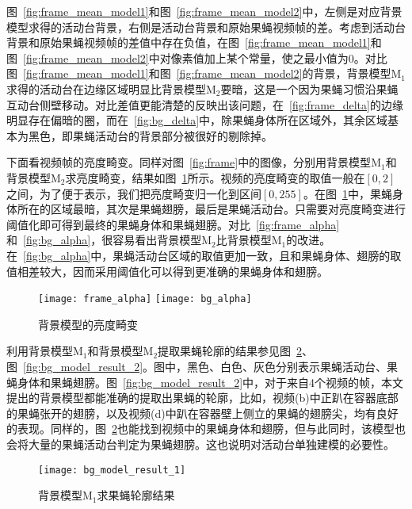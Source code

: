 图~\ref{fig:frame_mean_model1}和图~\ref{fig:frame_mean_model2}中，左侧是对应背景模型求得的活动台背景，右侧是活动台背景和原始果蝇视频帧的差。考虑到活动台背景和原始果蝇视频帧的差值中存在负值，在图~\ref{fig:frame_mean_model1}和图~\ref{fig:frame_mean_model2}中对像素值加上某个常量，使之最小值为0。对比图~\ref{fig:frame_mean_model1}和图~\ref{fig:frame_mean_model2}的背景，背景模型$\textrm{M}_1$求得的活动台在边缘区域明显比背景模型$\textrm{M}_2$要暗，这是一个因为果蝇习惯沿果蝇互动台侧壁移动。对比差值更能清楚的反映出该问题，在~\ref{fig:frame_delta}的边缘明显存在偏暗的圈，而在~\ref{fig:bg_delta}中，除果蝇身体所在区域外，其余区域基本为黑色，即果蝇活动台的背景部分被很好的剔除掉。

下面看视频帧的亮度畸变。同样对图~\ref{fig:frame}中的图像，分别用背景模型$\textrm{M}_1$和背景模型$\textrm{M}_2$求亮度畸变，结果如图~\ref{fig:model_alpha}所示。视频的亮度畸变的取值一般在$[0, 2]$之间，为了便于表示，我们把亮度畸变归一化到区间$[0, 255]$。在图~\ref{fig:model_alpha}中，果蝇身体所在的区域最暗，其次是果蝇翅膀，最后是果蝇活动台。只需要对亮度畸变进行阈值化即可得到最终的果蝇身体和果蝇翅膀。对比~\ref{fig:frame_alpha}和~\ref{fig:bg_alpha}，很容易看出背景模型$\textrm{M}_2$比背景模型$\textrm{M}_1$的改进。在~\ref{fig:bg_alpha}中，果蝇活动台区域的取值更加一致，且和果蝇身体、翅膀的取值相差较大，因而采用阈值化可以得到更准确的果蝇身体和翅膀。

\begin{figure}
\centering
{} {
    \texttt{[image: frame\_alpha]}
}
\hspace{10pt}
 {
    \texttt{[image: bg\_alpha]}
}
\caption{背景模型的亮度畸变}
\label{fig:model_alpha}
\end{figure}

利用背景模型$\textrm{M}_1$和背景模型$\textrm{M}_2$提取果蝇轮廓的结果参见图~\ref{fig:bg_model_result_1}、 图~\ref{fig:bg_model_result_2}。图中，黑色、白色、灰色分别表示果蝇活动台、果蝇身体和果蝇翅膀。图~\ref{fig:bg_model_result_2}中，对于来自4个视频的帧，本文提出的背景模型都能准确的提取出果蝇的轮廓，比如，视频(b)中正趴在容器底部的果蝇张开的翅膀，以及视频(d)中趴在容器壁上侧立的果蝇的翅膀尖，均有良好的表现。同样的，图~\ref{fig:bg_model_result_1}也能找到视频中的果蝇身体和翅膀，但与此同时，该模型也会将大量的果蝇活动台判定为果蝇翅膀。这也说明对活动台单独建模的必要性。

\begin{figure}[htb]
\centering
\texttt{[image: bg\_model\_result\_1]}
\caption{背景模型$\textrm{M}_1$求果蝇轮廓结果}
\label{fig:bg_model_result_1}
\end{figure}

